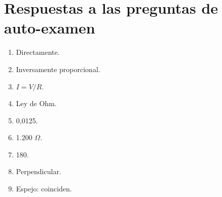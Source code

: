 \documentclass[12pt]{article}
\begin{document}
\section*{Respuestas a las preguntas de auto-examen}
\begin{enumerate}
    \item Directamente.
    \item Inversamente proporcional.
    \item \( I = V / R \).
    \item Ley de Ohm.
    \item 0,0125.
    \item 1.200 \( \Omega \).
    \item 180.
    \item Perpendicular.
    \item Espejo: coinciden.
\end{enumerate}
\end{document}
